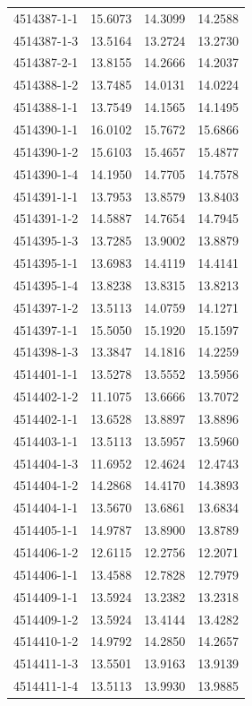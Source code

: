 \begin{longtable}{lrrr}
4514387-1-1 & 15.6073 & 14.3099 & 14.2588 \\
4514387-1-3 & 13.5164 & 13.2724 & 13.2730 \\
4514387-2-1 & 13.8155 & 14.2666 & 14.2037 \\
4514388-1-2 & 13.7485 & 14.0131 & 14.0224 \\
4514388-1-1 & 13.7549 & 14.1565 & 14.1495 \\
4514390-1-1 & 16.0102 & 15.7672 & 15.6866 \\
4514390-1-2 & 15.6103 & 15.4657 & 15.4877 \\
4514390-1-4 & 14.1950 & 14.7705 & 14.7578 \\
4514391-1-1 & 13.7953 & 13.8579 & 13.8403 \\
4514391-1-2 & 14.5887 & 14.7654 & 14.7945 \\
4514395-1-3 & 13.7285 & 13.9002 & 13.8879 \\
4514395-1-1 & 13.6983 & 14.4119 & 14.4141 \\
4514395-1-4 & 13.8238 & 13.8315 & 13.8213 \\
4514397-1-2 & 13.5113 & 14.0759 & 14.1271 \\
4514397-1-1 & 15.5050 & 15.1920 & 15.1597 \\
4514398-1-3 & 13.3847 & 14.1816 & 14.2259 \\
4514401-1-1 & 13.5278 & 13.5552 & 13.5956 \\
4514402-1-2 & 11.1075 & 13.6666 & 13.7072 \\
4514402-1-1 & 13.6528 & 13.8897 & 13.8896 \\
4514403-1-1 & 13.5113 & 13.5957 & 13.5960 \\
4514404-1-3 & 11.6952 & 12.4624 & 12.4743 \\
4514404-1-2 & 14.2868 & 14.4170 & 14.3893 \\
4514404-1-1 & 13.5670 & 13.6861 & 13.6834 \\
4514405-1-1 & 14.9787 & 13.8900 & 13.8789 \\
4514406-1-2 & 12.6115 & 12.2756 & 12.2071 \\
4514406-1-1 & 13.4588 & 12.7828 & 12.7979 \\
4514409-1-1 & 13.5924 & 13.2382 & 13.2318 \\
4514409-1-2 & 13.5924 & 13.4144 & 13.4282 \\
4514410-1-2 & 14.9792 & 14.2850 & 14.2657 \\
4514411-1-3 & 13.5501 & 13.9163 & 13.9139 \\
4514411-1-4 & 13.5113 & 13.9930 & 13.9885 \\

\end{longtable}
